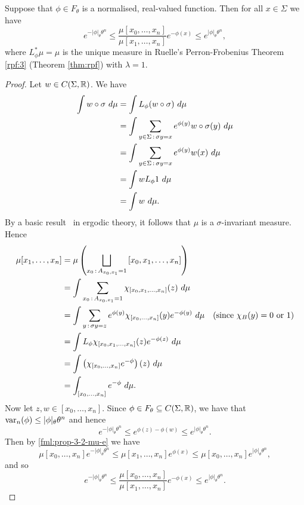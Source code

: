 \begin{proposition} \label{prop:pp-3-2}
	Suppose that $\phi \in F_\theta$ is a normalised, real-valued function. Then for all $x \in \Sigma$ we have
	\begin{equation}
		e^{-|\phi|_\theta \theta^n} \leq \frac{\mu[x_0, \dots, x_n]}{\mu[x_1, \dots, x_n]} e^{-\phi(x)} \leq e^{|\phi|_\theta \theta^n},
	\end{equation}
	where $L_\phi^*\mu = \mu$ is the unique measure in Ruelle's Perron-Frobenius Theorem \ref{rpf:3} (Theorem \ref{thm:rpf}) with $\lambda = 1$.
	\begin{proof}
		Let $w \in C(\Sigma, \mathbb{R})$. We have
		\begin{align*}
			\int{w \circ \sigma\ d\mu} &= \int L_\phi(w \circ \sigma)\ d\mu \\
				&= \int{\sum_{y \in \Sigma \,:\,\sigma{y} = x}{e^{\phi(y)} w \circ \sigma(y)}\ d\mu} \\
				&= \int{\sum_{y \in \Sigma \,:\,\sigma{y} = x}{e^{\phi(y)} w(x)}\ d\mu} \\
				&= \int{w L_\phi{1}\ d\mu} \\
				&= \int{w\ d\mu}.
		\end{align*}
		By a basic result~\cite[Lemma 11.3]{ergodic-lectures} in ergodic theory, it follows that $\mu$ is a $\sigma$-invariant measure. Hence
		\begin{align}
			\mu[x_1, \dots, x_n] &= \mu\left(\bigsqcup_{x_0 \,:\, A_{x_0, x_1} = 1}{[x_0, x_1, \dots, x_n]}\right) \nonumber \\
				&= \int{\sum_{x_0 \,:\,A_{x_0, x_1} = 1} \chi_{[x_0, x_1, \dots, x_n]}(z)\ d\mu} \nonumber \\
				&= \int{\sum_{y \,:\,\sigma{y} = z} e^{\phi(y)} \chi_{[x_0, \dots, x_n]}(y) e^{-\phi(y)}\ d\mu} & (\text{since } \chi_B(y) = 0 \text{ or } 1) \nonumber \\
				&= \int{L_\phi\chi_{[x_0, x_1, \dots, x_n]}(z) e^{-\phi(z)}\ d\mu} \nonumber \\
				&= \int{\left(\chi_{[x_0, \dots, x_n]} e^{-\phi}\right)(z)\ d\mu} \nonumber \\
				&= \int_{[x_0, \dots, x_n]}{e^{-\phi}\ d\mu}. \label{fml:prop-3-2-mu-e}
		\end{align}
		Now let $z, w \in [x_0, \dots, x_n]$. Since $\phi \in F_\theta \subseteq C(\Sigma, \mathbb{R})$, we have that $\operatorname{var}_n(\phi) \leq |\phi|_\theta \theta^n$ and hence
		\[
			e^{-|\phi|_\theta \theta^n} \leq e^{\phi(z) - \phi(w)} \leq e^{|\phi|_\theta \theta^n}.
		\]
		Then by \eqref{fml:prop-3-2-mu-e} we have
		\[
			\mu[x_0, \dots, x_n] e^{-|\phi|_\theta \theta^n} \leq \mu[x_1, \dots, x_n] e^{\phi(x)} \leq \mu[x_0, \dots, x_n] e^{|\phi|_\theta \theta^n},
		\]
		and so
		\[
			e^{-|\phi|_\theta \theta^n} \leq \frac{\mu[x_0, \dots, x_n]}{\mu[x_1, \dots, x_n]} e^{-\phi(x)} \leq e^{|\phi|_\theta \theta^n}.
		\]
	\end{proof}
\end{proposition}

